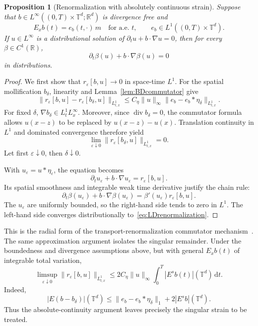 \documentclass[review,12pt,times,a4paper,nopreprintline]{elsarticle}
\theoremstyle{plain}
\newtheorem{proposition}[theorem]{Proposition}
\theoremstyle{definition}
\theoremstyle{remark}
\newcommand{\T}{\mathbb T}
\newcommand{\R}{\mathbb R}
\newcommand{\dd}{\,\mathrm d}
\newcommand{\diver}{\operatorname{div}}
\numberwithin{equation}{section}
\begin{document}
\begin{proposition}[Renormalization with absolutely continuous strain]\label{prop:LDrenormalization}
Suppose that $b\in L^\infty((0,T)\times\T^d;\R^d)$ is divergence free and
\[
 E_xb(t)=e_b(t,\cdot)\,m\quad\text{for a.e. }t,\qquad
 e_b\in L^1((0,T)\times\T^d).
\]
If $u\in L^\infty$ is a distributional solution of $\partial_tu+b\cdot\nabla u=0$, then for every $\beta\in C^1(\R)$,
\begin{equation}\label{eq:LDrenormalization}
 \partial_t\beta(u)+b\cdot\nabla\beta(u)=0
\end{equation}
in distributions.
\end{proposition}
\begin{proof}
We first show that $r_\varepsilon[b,u]\to0$ in space-time $L^1$. For the spatial mollification $b_\delta$, linearity and Lemma~\ref{lem:BDcommutator} give
\[
 \|r_\varepsilon[b,u]-r_\varepsilon[b_\delta,u]\|_{L^1_{t,x}}
 \leq C_\eta\|u\|_\infty\|e_b-e_b*\eta_\delta\|_{L^1_{t,x}}.
\]
For fixed $\delta$, $\nabla b_\delta\in L^1_tL^\infty_x$. Moreover, since $\diver b_\delta=0$, the commutator formula allows $u(x-z)$ to be replaced by $u(x-z)-u(x)$. Translation continuity in $L^1$ and dominated convergence therefore yield
\[
 \lim_{\varepsilon\downarrow0}\|r_\varepsilon[b_\delta,u]\|_{L^1_{t,x}}=0.
\]
Let first $\varepsilon\downarrow0$, then $\delta\downarrow0$.

With $u_\varepsilon=u*\eta_\varepsilon$, the equation becomes
\[
 \partial_tu_\varepsilon+b\cdot\nabla u_\varepsilon=r_\varepsilon[b,u].
\]
Its spatial smoothness and integrable weak time derivative justify the chain rule:
\[
 \partial_t\beta(u_\varepsilon)+b\cdot\nabla\beta(u_\varepsilon)
 =\beta'(u_\varepsilon)r_\varepsilon[b,u].
\]
The $u_\varepsilon$ are uniformly bounded, so the right-hand side tends to zero in $L^1$. The left-hand side converges distributionally to~\eqref{eq:LDrenormalization}.
\end{proof}

This is the radial form of the transport-renormalization commutator mechanism~\cite{DL,Ambrosio}. The same approximation argument isolates the singular remainder. Under the boundedness and divergence assumptions above, but with general $E_xb(t)$ of integrable total variation,
\begin{equation}\label{eq:singularremainder}
 \limsup_{\varepsilon\downarrow0}\|r_\varepsilon[b,u]\|_{L^1_{t,x}}
 \leq2C_\eta\|u\|_\infty\int_0^T|E^sb(t)|(\T^d)\dd t.
\end{equation}
Indeed,
\[
 |E(b-b_\delta)|(\T^d)
 \leq\|e_b-e_b*\eta_\delta\|_1+2|E^sb|(\T^d).
\]
Thus the absolute-continuity argument leaves precisely the singular strain to be treated.
\end{document}
